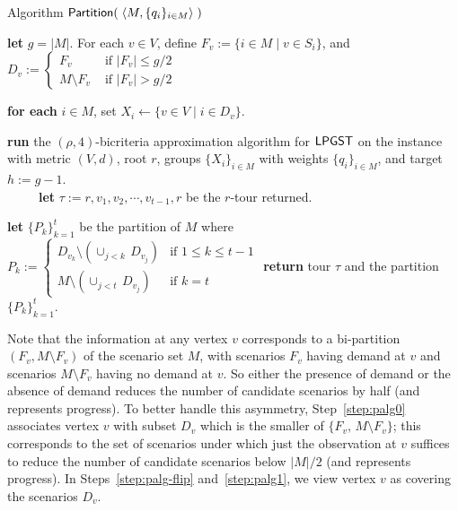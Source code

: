 \documentclass[11pt]{article}
\def\palg{\ensuremath{{\sf Partition}}\xspace}
\def\lpgst{\ensuremath{{\sf LPGST}}\xspace}
\begin{document}
\begin{algorithm}
  \caption{Algorithm $\palg(\;\langle M,\{q_i\}_{i\in M} \rangle\;)$}
  \label{alg:palg}
  \begin{algorithmic}[1]
    \STATE \label{step:palg0} \textbf{let} $g = |M|$. For each $v\in V$,
    define $F_v:=\{i\in M\mid v\in S_i\}$, and
    {\small $D_v := \left\{\begin{array}{ll} F_v & \mbox{ if }|F_v|\le
     g/2\\
    M\setminus F_v &\mbox{ if }|F_v|>  g/2\end{array}\right.$}

    \STATE \label{step:palg-flip}
    \textbf{for each} $i\in M$, set $X_i\leftarrow \{v\in V\mid i\in
    D_v\}$.

    \STATE\label{step:palg1} \textbf{run} the $(\rho,4)$-bicriteria approximation algorithm for \lpgst on the instance 
  with metric $(V,d)$, root $r$, groups
    $\{X_i\}_{i\in M}$ with weights $\{q_i\}_{i\in M}$, and target
    $h:=g-1$. \\
    ~~~~~\textbf{let} $\tau:=r,v_1,v_2,\cdots,v_{t-1},r$ be the $r$-tour
    returned.

    \STATE \label{step:palg2} \textbf{let} $\{P_k\}_{k=1}^t$ be the
    partition of $M$ where
    {\small $P_k:= \left\{
      \begin{array}{ll}
        D_{v_k}\setminus \left(\cup_{j<k} \, D_{v_j}\right) & \text{if }
        1\le k\le t-1\\
        M\setminus \left(\cup_{j<t} \, D_{v_j}\right) & \text{if }
        k=t\end{array}\right.
    $}
    \STATE \textbf{return} tour $\tau$ and the partition
    $\{P_k\}_{k=1}^t$.
  \end{algorithmic}
\end{algorithm}





Note that the information at any vertex $v$ corresponds to a bi-partition $(F_v, M\setminus F_v)$ of the scenario set
$M$, with scenarios $F_v$ having demand at $v$ and scenarios $M\setminus F_v$ having no demand at $v$. So either the
presence of demand or the absence of demand reduces the number of candidate scenarios by half (and represents progress).
To better handle this asymmetry, Step~\ref{step:palg0} associates vertex $v$ with subset $D_v$ which is the smaller of
$\{F_v, \, M\setminus F_v\}$; this corresponds to the set of scenarios under which just the observation at $v$ suffices to 
reduce the number of candidate scenarios below $|M|/2$ (and represents progress). In Steps~\ref{step:palg-flip} and~\ref{step:palg1}, we view vertex $v$ as covering the
scenarios $D_v$.
\end{document}
